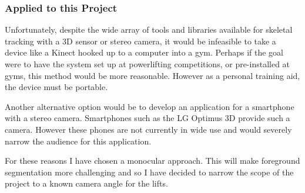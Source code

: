 \subsubsection{Applied to this Project}

Unfortunately, despite the wide array of tools and libraries available for skeletal tracking with a 3D sensor or stereo camera, it would be infeasible to take a device like a Kinect hooked up to a computer into a gym. Perhaps if the goal were to have the system set up at powerlifting competitions, or pre-installed at gyms, this method would be more reasonable. However as a personal training aid, the device must be portable.

Another alternative option would be to develop an application for a smartphone with a stereo camera. Smartphones such as the LG Optimus 3D\cite{lgoptimus} provide such a camera. However these phones are not currently in wide use and would severely narrow the audience for this application.

For these reasons I have chosen a monocular approach. This will make foreground segmentation more challenging and so I have decided to narrow the scope of the project to a known camera angle for the lifts.